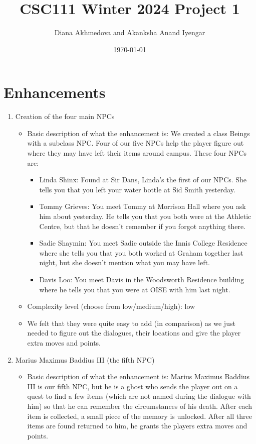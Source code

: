 \documentclass[11pt]{article}
\title{CSC111 Winter 2024 Project 1}
\author{Diana Akhmedova and Akanksha Anand Iyengar}
\date{\today}
\begin{document}
\maketitle

\section*{Enhancements}


\begin{enumerate}

\item Creation of the four main NPCs
	\begin{itemize}
	\item Basic description of what the enhancement is: We created a class Beings with a subclass NPC. Four of our five NPCs help the player figure out where they may have left their items around campus. These four NPCs are: 
            \begin{itemize}
                \item Linda Shinx: Found at Sir Dans, Linda's the first of our NPCs. She tells you that you left your water bottle at Sid Smith yesterday.
                \item Tommy Grieves: You meet Tommy at Morrison Hall where you ask him about yesterday. He tells you that you both were at the Athletic Centre, but that he doesn't remember if you forgot anything there.
                \item Sadie Shaymin: You meet Sadie outside the Innis College Residence where she tells you that you both worked at Graham together last night, but she doesn't mention what you may have left.
                \item Davis Loo: You meet Davis in the Woodsworth Residence building where he tells you that you were at OISE with him last night.
            \end{itemize}
	\item Complexity level (choose from low/medium/high): low
	\item We felt that they were quite easy to add (in comparison) as we just needed to figure out the dialogues, their locations and give the player extra moves and points.
	\end{itemize}
\item Marius Maximus Baddius III (the fifth NPC)
    \begin{itemize}
    \item Basic description of what the enhancement is: Marius Maximus Baddius III is our fifth NPC, but he is a ghost who sends the player out on a quest to find a few items (which are not named during the dialogue with him) so that he can remember the circumstances of his death. After each item is collected, a small piece of the memory is unlocked. After all three items are found returned to him, he grants the players extra moves and points.

\end{itemize}
\end{enumerate}
\end{document}
